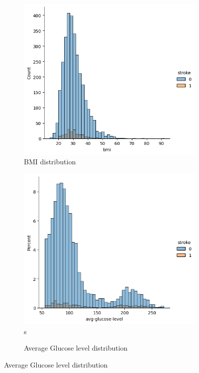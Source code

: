 \documentclass[twocolumn, 9pt]{extarticle}
\begin{document}
\begin{figure}[ht]
\centering
\begin{subfigure}[b]{\linewidth}
\centering
\includegraphics[scale=0.4]{images/bmi_distribution.png}
\caption{BMI distribution}
\label{fig:bmi_distribution}
\end{subfigure}

\begin{subfigure}[b]{\linewidth}
\centering
\includegraphics[scale=0.4]{images/glucose_distribution.png}s
\caption{Average Glucose level distribution}
\label{fig:glucose}
\end{subfigure}


\end{figure}
\end{document}

